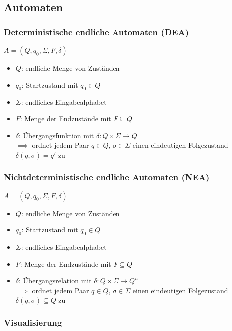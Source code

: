 \documentclass{article}
\begin{document}
	\subsection{Automaten}
	
	\subsubsection{Deterministische endliche Automaten (DEA)}
	
	$A = (Q, q_0, \Sigma, F, \delta)$
	\begin{itemize}
		\item $Q$: endliche Menge von Zuständen
		\item $q_0$: Startzustand mit $q_0 \in Q$
		\item $\Sigma$: endliches Eingabealphabet
		\item $F$: Menge der Endzustände mit $F \subseteq Q$
		\item $\delta$: Übergangsfunktion mit $\delta: Q \times \Sigma \rightarrow Q$ \\
		$\implies$ ordnet jedem Paar $q \in Q$, $\sigma \in \Sigma$ einen eindeutigen Folgezustand $\delta(q,\sigma) = q'$ zu
	\end{itemize}
	
	\subsubsection{Nichtdeterministische endliche Automaten (NEA)}
	
	$A = (Q, q_0, \Sigma, F, \delta)$
	\begin{itemize}
		\item $Q$: endliche Menge von Zuständen
		\item $q_0$: Startzustand mit $q_0 \in Q$
		\item $\Sigma$: endliches Eingabealphabet
		\item $F$: Menge der Endzustände mit $F \subseteq Q$
		\item $\delta$: Übergangsrelation mit $\delta: Q \times \Sigma \rightarrow Q^n$ \\
		$\implies$ ordnet jedem Paar $q \in Q$, $\sigma \in \Sigma$ einen eindeutigen Folgezustand $\delta(q,\sigma) \subseteq Q$ zu
	\end{itemize}
	
	\subsubsection{Visualisierung}
	
\end{document}
